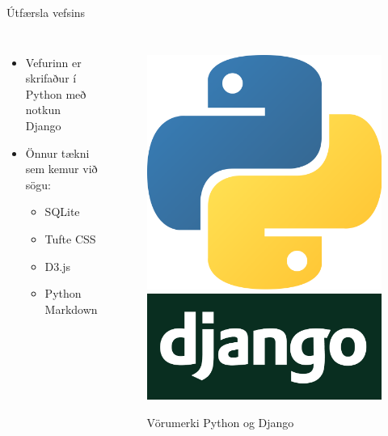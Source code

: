 \documentclass{beamer}
\begin{document}
\begin{frame}{Útfærsla vefsins}
    \begin{columns}
        \begin{itemize}
            \item Vefurinn er skrifaður í Python með notkun Django
            \item Önnur tækni sem kemur við sögu:
            \begin{itemize}
                \item SQLite
                \item Tufte CSS
                \item D3.js
                \item Python Markdown
            \end{itemize}
        \end{itemize}
        \begin{figure}
            \caption{Vörumerki Python og Django}
            \includegraphics[width=0.6\linewidth]{python-logo}
            \vspace{1cm}
            \includegraphics[width=0.8\linewidth]{django-logo}
        \end{figure}
    \end{columns}
\end{frame}
\end{document}
